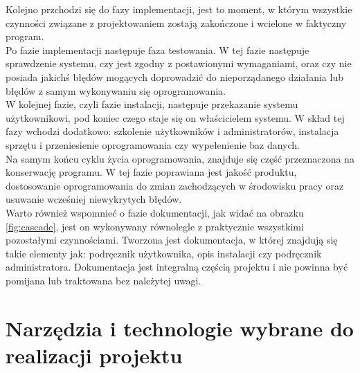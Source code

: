 \documentclass[12pt]{article}
\begin{document}
\begin{sloppypar}
{{    Kolejno przchodzi się do fazy implementacji, jest to moment, w którym wszystkie czynności związane z projektowaniem zostają zakończone i wcielone w faktyczny program.\\
    Po fazie implementacji następuje faza testowania. 
    W tej fazie następuje sprawdzenie systemu, czy jest zgodny z postawionymi wymaganiami, 
    oraz czy nie posiada jakichś błędów mogących doprowadzić do nieporządanego działania lub błędów z samym wykonywaniu się oprogramowania.\\
    W kolejnej fazie, czyli fazie instalacji, następuje przekazanie systemu użytkownikowi, pod koniec czego staje się on właścicielem systemu. 
    W skład tej fazy wchodzi dodatkowo: szkolenie użytkowników i administratorów, instalacja sprzętu i przeniesienie oprogramowania czy wypełenienie baz danych.\\
    Na samym końcu cyklu życia oprogramowania, znajduje się część przeznaczona na konserwację programu. 
    W tej fazie poprawiana jest jakość produktu, dostosowanie oprogramowania do zmian zachodzących w środowisku pracy oraz usuwanie wcześniej niewykrytych błędów.\\
    Warto również wspomnieć o fazie dokumentacji, jak widać na obrazku \ref{fig:cascade}, jest on wykonywany równolegle z praktycznie wszystkimi pozostałymi czynnościami. 
    Tworzona jest dokumentacja, w której znajdują się takie elementy jak: podręcznik użytkownika, opis instalacji czy podręcznik administratora. 
    Dokumentacja jest integralną częścią projektu i nie powinna być pomijana lub traktowana bez należytej uwagi.
  }
}

\section{Narzędzia i technologie wybrane do realizacji projektu}
{
}
\end{sloppypar}
\end{document}
